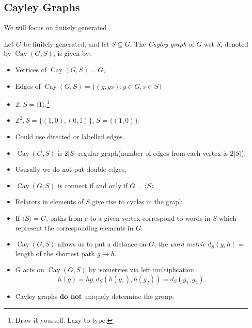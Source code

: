 \documentclass[a4paper]{article}
\begin{document}
    \subsection{Cayley Graphs}
    We will focus on finitely generated .
    \begin{definition}
        Let $G$ be finitely generated, and let $ S \subseteq G $. The \textit{Cayley graph} of $G$ wrt $S$, denoted by $ \operatorname{Cay}(G,S)  $, is given by:
        \begin{itemize}
            \item Vertices of $ \operatorname{Cay}(G,S)=G  $,
            \item Edges of $ \operatorname{Cay}(G,S)=\{(g,gs):g\in G,s\in S\} $
        \end{itemize}
    \end{definition}
    \begin{example}
        \begin{itemize}
            \item $ \mathbb{Z}, S= \langle 1 \rangle $.\footnote{Draw it yourself. Lazy to type.}
            \item $ \mathbb{Z}^2,S=\{(1,0),(0,1)\} $, $ S=\{(1,0)\} $.
        \end{itemize}
    \end{example}
    \begin{remark}
        \begin{itemize}
            \item Could use directed or labelled edges.
            \item $ \operatorname{Cay}(G,S)  $ is $ 2|S| $-regular graph(number of edges from each vertex is $ 2|S| $).
            \item Ususally we do not put double edges.
            \item $ \operatorname{Cay}(G,S)  $ is connect if and only if $ G=\langle S \rangle $.
            \item Relators in elements of $S$ give rise to cycles in the graph.
            \item If $ \langle S \rangle =G $, paths from $e$ to a given vertex correspond to words in $S$ which represent the corresponding elements in $G$.
            \item $ \operatorname{Cay}(G,S)  $ allows us to put a distance on $G$, the \textit{word metric} $ d_S(g,h) = $ length of the shortest path $ g\to h $.
            \item $G$ acts on $ \operatorname{Cay}(G,S)  $ by isometries via left multiplication: 
            \[
                h(g)=hg, d_S(h(g_1),h(g_2))=d_S(g_1,g_2) .
            \]
            \item Cayley graphs \textbf{do not} uniquely determine the group.
        \end{itemize}
    \end{remark}
\end{document}
